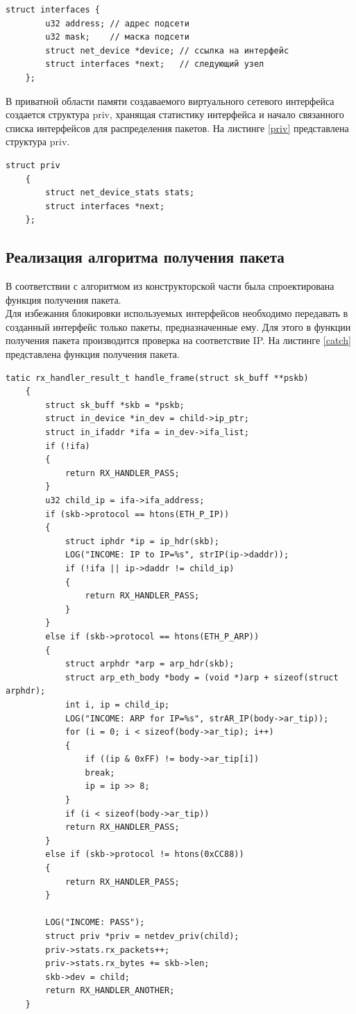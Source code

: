 \documentclass[14pt, a4paper]{extarticle}
\begin{document}
\begin{lstlisting}[caption=struct interfaces, label={linkd}]
	struct interfaces {
		u32 address; // адрес подсети
		u32 mask;    // маска подсети
		struct net_device *device; // ссылка на интерфейс
		struct interfaces *next;   // следующий узел
	};
\end{lstlisting}

В приватной области памяти создаваемого виртуального сетевого интерфейса создается структура priv, хранящая статистику интерфейса и начало связанного списка интерфейсов для распределения пакетов. На листинге \ref{priv} представлена структура priv.
\begin{lstlisting}[caption=Структура приватной области интерфейса, label=priv]
	struct priv
	{
		struct net_device_stats stats;
		struct interfaces *next;
	};
\end{lstlisting}

\subsection{Реализация алгоритма получения пакета}
В соответствии с алгоритмом из конструкторской части была спроектирована функция получения пакета. \\
\indent Для избежания блокировки используемых интерфейсов необходимо передавать в созданный интерфейс только пакеты, предназначенные ему. Для этого в функции получения пакета производится проверка на соответствие IP. На листинге \ref{catch} представлена функция получения пакета.
\begin{lstlisting}[caption=Функция получения, label=catch]
	tatic rx_handler_result_t handle_frame(struct sk_buff **pskb)
	{
		struct sk_buff *skb = *pskb;
		struct in_device *in_dev = child->ip_ptr;
		struct in_ifaddr *ifa = in_dev->ifa_list;
		if (!ifa)
		{
			return RX_HANDLER_PASS;
		}
		u32 child_ip = ifa->ifa_address;
		if (skb->protocol == htons(ETH_P_IP))
		{
			struct iphdr *ip = ip_hdr(skb);
			LOG("INCOME: IP to IP=%s", strIP(ip->daddr));
			if (!ifa || ip->daddr != child_ip)
			{
				return RX_HANDLER_PASS;
			}
		}
		else if (skb->protocol == htons(ETH_P_ARP))
		{
			struct arphdr *arp = arp_hdr(skb);
			struct arp_eth_body *body = (void *)arp + sizeof(struct arphdr);
			int i, ip = child_ip;
			LOG("INCOME: ARP for IP=%s", strAR_IP(body->ar_tip));
			for (i = 0; i < sizeof(body->ar_tip); i++)
			{
				if ((ip & 0xFF) != body->ar_tip[i])
				break;
				ip = ip >> 8;
			}
			if (i < sizeof(body->ar_tip))
			return RX_HANDLER_PASS;
		}
		else if (skb->protocol != htons(0xCC88))
		{
			return RX_HANDLER_PASS;
		}
		
		LOG("INCOME: PASS");
		struct priv *priv = netdev_priv(child);
		priv->stats.rx_packets++;
		priv->stats.rx_bytes += skb->len;
		skb->dev = child;
		return RX_HANDLER_ANOTHER;
	}
\end{lstlisting}
\end{document}
